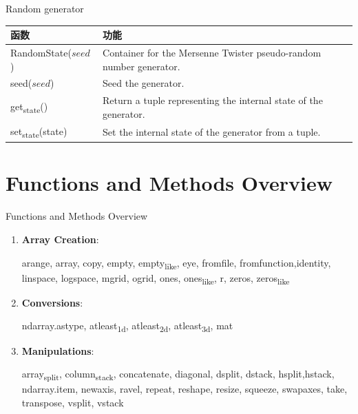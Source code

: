 \documentclass[ignorenonframetext,11pt,xcolor=dvipsnames,hyperref={colorlinks,allcolors=.,urlcolor=blue, citecolor=violet, bookmarksdepth=4},aspectratio=1610]{beamer}
\begin{document}
\begin{frame}{Random generator}
\protect\hypertarget{random-generator}{}

\scriptsize

\begin{longtable}[]{@{}ll@{}}
\toprule
函数 & 功能\tabularnewline
\midrule
\endhead
RandomState(\(seed\)) & Container for the Mersenne Twister pseudo-random
number generator.\tabularnewline
seed(\(seed\)) & Seed the generator.\tabularnewline
get\textsubscript{state}() & Return a tuple representing the internal
state of the generator.\tabularnewline
set\textsubscript{state}(state) & Set the internal state of the
generator from a tuple.\tabularnewline
\bottomrule
\end{longtable}

\end{frame}

\hypertarget{functions-and-methods-overview}{%
\section{Functions and Methods
Overview}\label{functions-and-methods-overview}}

\begin{frame}{Functions and Methods Overview}
\protect\hypertarget{functions-and-methods-overview-1}{}

\begin{enumerate}
\item
  \textbf{Array Creation}:

  arange, array, copy, empty, empty\textsubscript{like}, eye, fromfile,
  fromfunction,identity, linspace, logspace, mgrid, ogrid, ones,
  ones\textsubscript{like}, r, zeros, zeros\textsubscript{like}
\item
  \textbf{Conversions}:

  ndarray.astype, atleast\textsubscript{1d}, atleast\textsubscript{2d},
  atleast\textsubscript{3d}, mat
\item
  \textbf{Manipulations}:

  array\textsubscript{split}, column\textsubscript{stack}, concatenate,
  diagonal, dsplit, dstack, hsplit,hstack, ndarray.item, newaxis, ravel,
  repeat, reshape, resize, squeeze, swapaxes, take, transpose, vsplit,
  vstack
\end{enumerate}

\end{frame}
\end{document}
